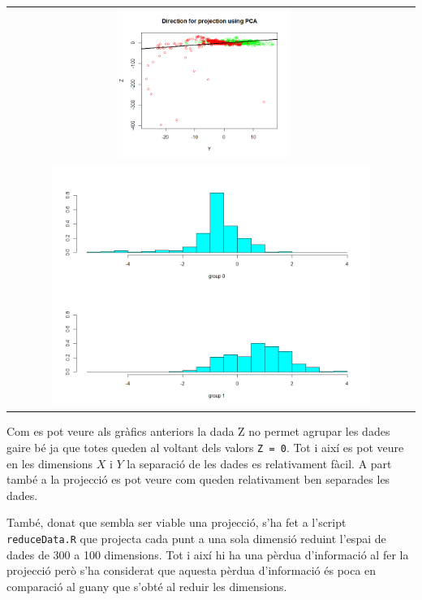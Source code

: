 \documentclass[a4paper]{article}
\begin{document}
\begin{longtable}{cc}
	\includegraphics[width=0.45\textwidth]{images/PCA_YZ} \\
	\multicolumn{2}{c}{\includegraphics[width=0.8\textwidth]{images/FDA_results}}
\end{longtable}

Com es pot veure als gràfics anteriors la dada Z no permet agrupar les dades gaire bé ja que totes queden al voltant dels valors \verb|Z = 0|. Tot i així es pot veure en les dimensions $X$ i $Y$ la separació de les dades es relativament fàcil. A part també a la projecció es pot veure com queden relativament ben separades les dades.

També, donat que sembla ser viable una projecció, s'ha fet a l'script \texttt{reduceData.R} que projecta cada punt a una sola dimensió reduint l'espai de dades de 300 a 100 dimensions. Tot i així hi ha una pèrdua d'informació al fer la projecció però s'ha considerat que aquesta pèrdua d'informació és poca en comparació al guany que s'obté al reduir les dimensions.
\end{document}
